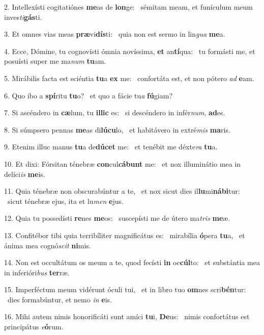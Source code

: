 2. Intellexísti cogitatiónes \textbf{me}as de \textbf{lon}ge: \ast\  sémitam meam, et funículum meum inves\textit{ti}\textbf{gás}ti.\

3. Et omnes vias meas \textbf{præ}vi\textbf{dís}ti: \ast\  quia non est sermo in lin\textit{gua} \textbf{me}a.\

4. Ecce, Dómine, tu cognovísti ómnia novíssima, \textbf{et} an\textbf{tí}qua: \ast\  tu formásti me, et posuísti super me ma\textit{num} \textbf{tu}am.\

5. Mirábilis facta est sciéntia \textbf{tu}a \textbf{ex} me: \ast\  confortáta est, et non pótero \textit{ad} \textbf{e}am.\

6. Quo ibo a \textbf{spí}ritu \textbf{tu}o? \ast\  et quo a fácie tu\textit{a} \textbf{fú}giam?\

7. Si ascéndero in \textbf{cæ}lum, tu \textbf{il}\textbf{lic} es: \ast\  si descéndero in infér\textit{num}, \textbf{ad}es.\

8. Si súmpsero pennas \textbf{me}as di\textbf{lú}\textbf{cu}lo, \ast\  et habitávero in extré\textit{mis} \textbf{ma}ris.\

9. Etenim illuc manus \textbf{tu}a de\textbf{dú}\textbf{cet} me: \ast\  et tenébit me déxte\textit{ra} \textbf{tu}a.\

10. Et dixi: Fórsitan ténebræ \textbf{con}cul\textbf{cá}\textbf{bunt} me: \ast\  et nox illuminátio mea in delíci\textit{is} \textbf{me}is.\

11. Quia ténebræ non obscurabúntur a te, \dag\  et nox sicut dies il\textbf{lu}mi\textbf{ná}\textbf{bi}tur: \ast\  sicut ténebræ ejus, ita et lu\textit{men} \textbf{e}jus.\

12. Quia tu possedísti \textbf{re}nes \textbf{me}os: \ast\  suscepísti me de útero ma\textit{tris} \textbf{me}æ.\

13. Confitébor tibi quia terribíliter magnificátus es: \dag\  mirabília \textbf{ó}pera \textbf{tu}a, \ast\  et ánima mea cognó\textit{scit} \textbf{ni}mis.\

14. Non est occultátum os meum a te, quod fecísti \textbf{in} oc\textbf{cúl}to: \ast\  et substántia mea in inferióri\textit{bus} \textbf{ter}ræ.\

15. Imperféctum meum vidérunt óculi tui, \dag\  et in libro tuo \textbf{om}nes scri\textbf{bén}tur: \ast\  dies formabúntur, et nemo \textit{in} \textbf{e}is.\

16. Mihi autem nimis honorificáti sunt amíci \textbf{tu}i, \textbf{De}us: \ast\  nimis confortátus est principátus \textit{e}\textbf{ó}rum.\

